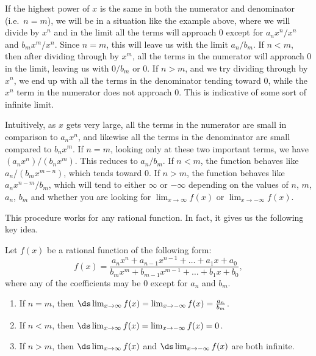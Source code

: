 If the highest power of $x$ is the same in both the numerator and denominator (i.e.\ $n=m$), we will be in a situation like the example above, where we will divide by $x^n$ and in the limit all the terms will approach 0 except for $a_nx^n/x^n$ and $b_mx^m/x^n$. Since $n=m$, this will leave us with the limit $a_n/b_m$.  If $n<m$, then after dividing through by $x^m$, all the terms in the numerator will approach 0 in the limit, leaving us with $0/b_m$ or 0.  If $n>m$, and we try dividing through by $x^n$, we end up with all the terms in the denominator tending toward 0, while the $x^n$ term in the numerator does not approach 0.  This is indicative of some sort of infinite limit.

Intuitively, as $x$ gets very large, all the terms in the numerator are small in comparison to $a_nx^n$, and likewise all the terms in the denominator are small compared to $b_nx^m$.  If $n=m$, looking only at these two important terms, we have $(a_nx^n)/(b_nx^m)$.  This reduces to $a_n/b_m$.  If $n<m$, the function behaves like $a_n/(b_mx^{m-n})$, which tends toward 0.  If $n>m$, the function behaves like $a_nx^{n-m}/b_m$, which will tend to either $\infty$ or $-\infty$ depending on the values of $n$, $m$, $a_n$, $b_m$ and whether you are looking for $\lim_{x\rightarrow\infty} f(x)$ or $\lim_{x\rightarrow-\infty} f(x)$.

This procedure works for any rational function.  In fact, it gives us the following key idea.

\begin{keyidea}\label{thm:lim_rational_fn_at_infty}
Let $f(x)$ be a rational function of the following form:
\[f(x)=\frac{a_nx^n + a_{n-1}x^{n-1}+\dots + a_1x + a_0}{b_mx^m + b_{m-1}x^{m-1} + \dots + b_1x + b_0},\]
where any of the coefficients may be 0 except for $a_n$ and $b_m$.
\begin{enumerate}
\item If $n=m$, then $\ds\lim_{x\rightarrow\infty} f(x) = \lim_{x\rightarrow-\infty} f(x) = \frac{a_n}{b_m}$.
\item If $n<m$, then $\ds\lim_{x\rightarrow\infty} f(x) = \lim_{x\rightarrow-\infty} f(x) = 0$.
\item If $n>m$, then $\ds\lim_{x\rightarrow\infty} f(x)$ and $\ds\lim_{x\to-\infty} f(x)$ are both infinite.
\end{enumerate}
\end{keyidea}


